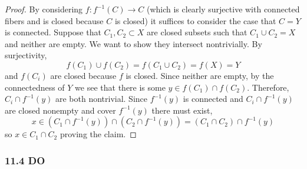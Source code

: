 \documentclass[12pt]{article}
\begin{document}
\begin{proof}
By considering $f : f^{-1}(C) \to C$ (which is clearly surjective with connected fibers and is closed because $C$ is closed) it suffices to consider the case that $C = Y$ is connected. 
Suppose that $C_1, C_2 \subset X$ are closed subsets such that $C_1 \cup C_2 = X$ and neither are empty. We want to show they intersect nontrivially. By surjectivity,
\[ f(C_1) \cup f(C_2) = f(C_1 \cup C_2) = f(X) = Y \]
and $f(C_i)$ are closed because $f$ is closed. Since neither are empty, by the connectedness of $Y$ we see that there is some $y \in f(C_1) \cap f(C_2)$. Therefore, $C_i \cap f^{-1}(y)$ are both nontrivial. Since $f^{-1}(y)$ is connected and $C_i \cap f^{-1}(y)$ are closed nonempty and cover $f^{-1}(y)$ there must exist,
\[ x \in (C_1 \cap f^{-1}(y)) \cap (C_2 \cap f^{-1}(y)) = (C_1 \cap C_2) \cap f^{-1}(y) \]
so $x \in C_1 \cap C_2$ proving the claim.
\end{proof}

\subsubsection{11.4 DO}
\end{document}
